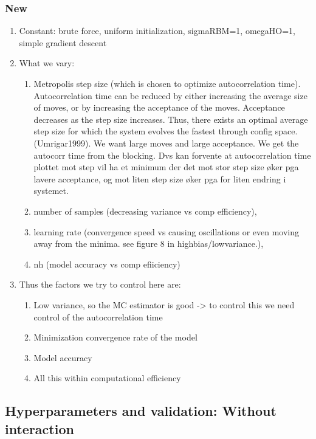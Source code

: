 \documentclass[twoside,english]{uiofysmaster}
\begin{document}
\subsubsection{New}
\begin{enumerate}
	\item Constant: brute force, uniform initialization, sigmaRBM=1, omegaHO=1, simple gradient descent
    \item What we vary: 
    \begin{enumerate}
        \item Metropolis step size (which is chosen to optimize autocorrelation time). Autocorrelation time can be reduced by either increasing the average size of moves, or by increasing the acceptance of the moves. Acceptance decreases as the step size increases. Thus, there exists an optimal average step size for which the system evolves the fastest through config space. (Umrigar1999). We want large moves and large acceptance. We get the autocorr time from the blocking. Dvs kan forvente at autocorrelation time plottet mot step vil ha et minimum der det mot stor step size øker pga lavere acceptance, og mot liten step size øker pga for liten endring i systemet.
        \item number of samples (decreasing variance vs comp efficiency), 
        \item learning rate (convergence speed vs causing oscillations or even moving away from the minima. see figure 8 in highbias/lowvariance.), 
        \item nh (model accuracy vs comp efiiciency) 
    \end{enumerate}
    \item Thus the factors we try to control here are:
    \begin{enumerate}
        \item Low variance, so the MC estimator is good -> to control this we need control of the autocorrelation time
        \item Minimization convergence rate of the model
        \item Model accuracy
        \item All this within computational efficiency
    \end{enumerate}
\end{enumerate}    

\subsection{Hyperparameters and validation: Without interaction}
\end{document}
